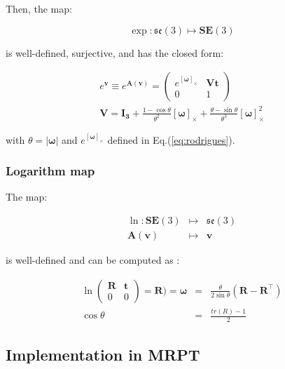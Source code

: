 \documentclass[a4paper,11pt]{report}
\newcommand{\W}{{\bm{\omega}}}
\newcommand{\R}{{\mathbf{R}}}
\begin{document}
Then, the map:

\begin{equation}
  \exp: \mathfrak{se}(3) \mapsto \mathbf{SE}(3)
\end{equation}

\noindent is well-defined, surjective, and has the closed form:

\begin{eqnarray}
  e^ { \mathbf{v} } \equiv  e^ { \mathbf{A}(\mathbf{v}) } =
\left(
\begin{array}{cc}
  e^{[\W]_\times} & \mathbf{V} \mathbf{t} \\
   0 & 1
\end{array}
\right)
\\
\mathbf{V} = \mathbf{I_3}
+ \frac{1-\cos \theta}{\theta^2} [\W]_\times 
+ \frac{\theta- \sin \theta}{\theta^3} [\W]^2_\times
\end{eqnarray}

\noindent with $\theta = |\W|$ and $e^{[\W]_\times}$ 
defined in Eq.(\ref{eq:rodrigues}).



\subsubsection{Logarithm map}

The map:

\begin{eqnarray}
  \ln: \mathbf{SE}(3) &\mapsto& \mathfrak{se}(3) \\
  \mathbf{A}(\mathbf{v})  & \mapsto & \mathbf{v}
\nonumber
\end{eqnarray}

\noindent is well-defined and can be computed as \cite{wang2008nps}:

\begin{eqnarray}
\label{eq:rodrigues_ln_se3}
 \ln 
\left(
\begin{array}{c|c}
\R & \mathbf{t} \\
0 & 0
\end{array}
\right)
= 
\mathbf{R}) = \W &=& \frac{\theta}{2\sin \theta} \left( \mathbf{R} - \mathbf{R}^\top \right)
\\
\cos \theta &=& \frac{tr(R)-1}{2}  \nonumber
\end{eqnarray}



\subsection{Implementation in MRPT}
\end{document}
